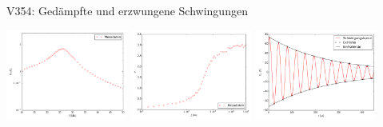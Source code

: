 \begin{Versuch}{V354: Gedämpfte und erzwungene Schwingungen}
\begin{Appendix}
    		\includegraphics[width=0.3\textwidth]{build/Bilder/rk.pdf}
    		\includegraphics[width=0.3\textwidth]{build/Bilder/vk.pdf}
    		\includegraphics[width=0.3\textwidth]{build/Bilder/ak.pdf}
    \end{Appendix}
    \end{Versuch}
